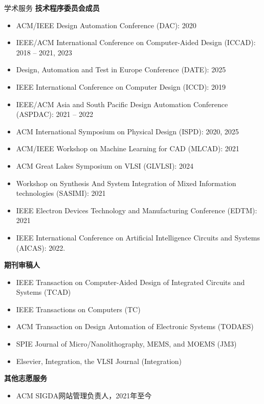 \begin{rSection}{学术服务}
\textbf{技术程序委员会成员}
\begin{itemize}
    \item ACM/IEEE Design Automation Conference (DAC): 2020
    \item IEEE/ACM International Conference on Computer-Aided Design (ICCAD): 2018 -- 2021, 2023
    \item Design, Automation and Test in Europe Conference (DATE): 2025
    \item IEEE International Conference on Computer Design (ICCD): 2019
    \item IEEE/ACM Asia and South Pacific Design Automation Conference (ASPDAC): 2021 -- 2022
    \item ACM International Symposium on Physical Design (ISPD): 2020, 2025
    \item ACM/IEEE Workshop on Machine Learning for CAD (MLCAD): 2021
    \item ACM Great Lakes Symposium on VLSI (GLVLSI): 2024
    \item Workshop on Synthesis And System Integration of Mixed Information technologies (SASIMI): 2021
    \item IEEE Electron Devices Technology and Manufacturing Conference (EDTM): 2021
    \item IEEE International Conference on Artificial Intelligence Circuits and Systems (AICAS): 2022. 
\end{itemize}

\textbf{期刊审稿人}
\begin{itemize}
    \item IEEE Transaction on Computer-Aided Design of Integrated Circuits and Systems (TCAD)
    \item IEEE Transactions on Computers (TC)
    \item ACM Transaction on Design Automation of Electronic Systems (TODAES)
    \item SPIE Journal of Micro/Nanolithography, MEMS, and MOEMS (JM3)
    \item Elsevier, Integration, the VLSI Journal (Integration)
\end{itemize}

\textbf{其他志愿服务}
\begin{itemize}
    \item ACM SIGDA网站管理负责人，2021年至今
\end{itemize}

\end{rSection}


